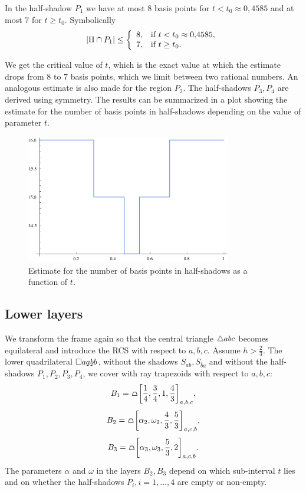 \begin{proposition}
In the half-shadow $P_{1}$ we have at most 8 basis points for $t < t_{0} \approx 0{,}4585$ and at most 7 for $t \geq t_{0}$. Symbolically
$$
\left|
\Pi \cap P_{1}
\right| \leq \left\{ \begin{array}{ll}  8,  & \mbox{if } t < t_{0} \approx 0{,}4585, \\  7,  & \mbox{if } t \geq t_{0}. \end{array} \right.
$$
\end{proposition}

We get the critical value of $t$, which is the exact value at which the estimate drops from 8 to 7 basis points, which we limit between two rational numbers. An analogous estimate is also made for the region $P_{2}$. The half-shadows $P_{3}, P_{4}$ are derived using symmetry. The results can be summarized in a plot showing the estimate for the number of basis points in half-shadows depending on the value of parameter $t$.

\begin{figure}
\centering
\includegraphics[width=0.8\textwidth]{./figures/estimates-in-half-shadows.pdf}
\caption{Estimate for the number of basis points in half-shadows as a function of $t$.}
\label{fig: estimates-in-half-shadows}
\end{figure}

\subsection{Lower layers}
We transform the frame again so that the central triangle $\triangle{abc}$ becomes equilateral and introduce the RCS with respect to $a,b,c$. Assume $h > \frac{2}{3}$. The lower quadrilateral $\rectansym{a\undersym{a}\undersym{b}b}$, without the shadows $S_{\overline{a}b}, S_{\overline{b}a}$ and without the half-shadows $P_{1}, P_{2}, P_{3}, P_{4}$, we cover with ray trapezoids with respect to $a,b,c$:
$$
B_{1} = \tpz{\left[ \frac{1}{4},\frac{3}{4},1,\frac{4}{3} \right]_{a,b,c} },
$$
$$
B_{2} = \tpz{\left[ \alpha_{2},\omega_{2},\frac{4}{3},\frac{5}{3} \right]_{a,c,b} },
$$
$$
B_{3} = \tpz{\left[ \alpha_{3},\omega_{3},\frac{5}{3},2 \right]_{a,c,b} }.
$$
The parameters $\alpha$ and $\omega$ in the layers $B_{2}, B_{3}$ depend on which sub-interval $t$ lies and on whether the half-shadows $P_{i}, i = 1,...,4$ are empty or non-empty.

